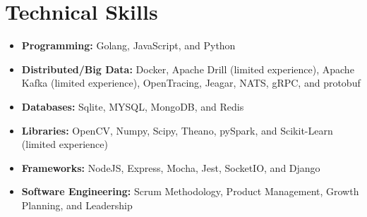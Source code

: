 \documentclass[10pt,a4paper,roman]{moderncv}        %
\begin{document}
\section{Technical Skills}
\begin{itemize} \itemsep \shortSpace
\item \textbf{Programming:} Golang, JavaScript, and Python

\item \textbf{Distributed/Big Data:} Docker, Apache Drill (limited experience), Apache Kafka (limited experience), OpenTracing, Jeagar, NATS, gRPC, and protobuf

\item \textbf{Databases:} Sqlite, MYSQL, MongoDB, and Redis

\item \textbf{Libraries:} OpenCV, Numpy, Scipy, Theano, pySpark, and Scikit-Learn (limited experience)

\item \textbf{Frameworks:} NodeJS, Express, Mocha, Jest, SocketIO, and Django

\item \textbf{Software Engineering:} Scrum Methodology, Product Management, Growth Planning, and Leadership

\end{itemize}
\end{document}
